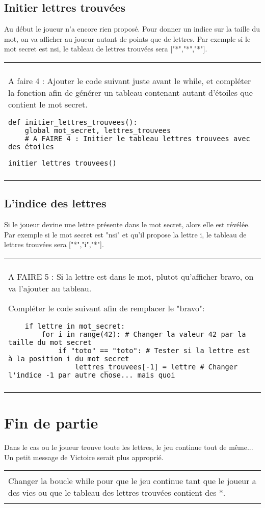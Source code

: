 \documentclass[12pt]{article}
\newenvironment{exercice}
    {\begin{center}
    \begin{tabular}{|p{0.9\textwidth}|}
    \hline\\
    }
    {
    \\\\\hline
    \end{tabular}
    \end{center}
    }
\begin{document}
\subsection{Initier lettres trouvées}
Au début le joueur n'a encore rien proposé. Pour donner un indice sur la taille du mot, on va afficher au joueur autant de points que de lettres.
Par exemple si le mot secret est nsi, le tableau de lettres trouvées sera ["*","*","*"].
\begin{exercice}
\ding{46} A faire 4 : Ajouter le code suivant juste avant le while, et compléter la fonction afin de générer un tableau contenant autant d'étoiles que contient le mot secret. \newline
\begin{verbatim}
def initier_lettres_trouvees():
    global mot_secret, lettres_trouvees
    # A FAIRE 4 : Initier le tableau lettres trouvees avec des étoiles

initier_lettres_trouvees()
\end{verbatim}

\end{exercice}


\subsection{L'indice des lettres}
Si le joueur devine une lettre présente dans le mot secret, alors elle est révélée. Par exemple si le mot secret est "nsi" et qu'il propose la lettre i, le tableau de lettres trouvées sera ["*","i","*"].

\begin{exercice}

   \ding{46} A FAIRE 5 : Si la lettre est dans le mot, plutot qu'afficher bravo, on va l'ajouter au tableau.

Compléter le code suivant afin de remplacer le "bravo":
\begin{verbatim}
    if lettre in mot_secret:
        for i in range(42): # Changer la valeur 42 par la taille du mot secret
            if "toto" == "toto": # Tester si la lettre est à la position i du mot secret
                lettres_trouvees[-1] = lettre # Changer l'indice -1 par autre chose... mais quoi

\end{verbatim}

\end{exercice}

\section{Fin de partie}
Dans le cas ou le joueur trouve toute les lettres, le jeu continue tout de même... Un petit message de Victoire serait plus approprié.
\begin{exercice}
Changer la boucle while pour que le jeu continue tant que le joueur a des vies ou que le tableau des lettres trouvées contient des *.
\end{exercice}
\end{document}
